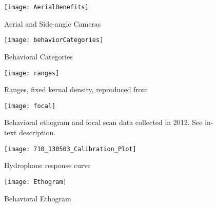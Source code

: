 \documentclass[11pt]{amsart}
\begin{document}




\begin{figure}
  \centering
    \texttt{[image: AerialBenefits]}
  \caption{Aerial and Side-angle Cameras} %
  \label{fig:aerialView}
\end{figure}

\begin{figure}
  \centering
    \texttt{[image: behaviorCategories]}
  \caption{Behavioral Categories} %
  \label{fig:behaviors}
\end{figure}

\begin{figure}
  \centering
    \texttt{[image: ranges]}
  \caption{Ranges, fixed kernal density, reproduced from \citet{randic:2012}} %
  \label{fig:ranges}
\end{figure}

\begin{figure}
  \centering
    \texttt{[image: focal]}
  \caption{Behavioral ethogram and focal scan data collected in 2012. See in-text description.} %
  \label{fig:ethogram}
\end{figure}

\begin{figure}
  \centering
    \texttt{[image: 710\_130503\_Calibration\_Plot]}
  \caption{Hydrophone response curve} %
  \label{fig:hydrophoneResponse}
\end{figure}

\begin{figure}
  \centering
    \texttt{[image: Ethogram]}
  \caption{Behavioral Ethogram} %
  \label{fig:ethogram}
\end{figure}

\clearpage



\end{document}
